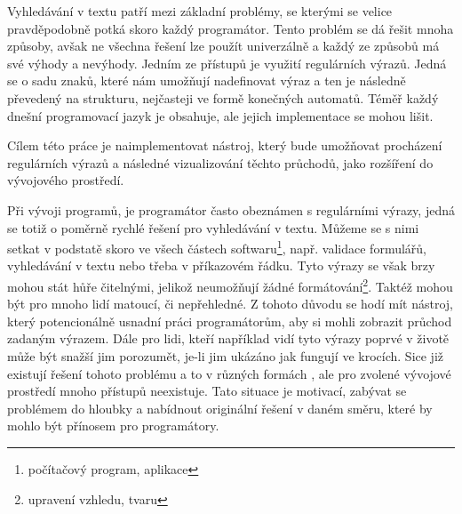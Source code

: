 Vyhledávání v textu patří mezi základní problémy, se kterými se velice pravděpodobně potká skoro každý programátor. 
Tento problém se dá řešit mnoha způsoby, avšak ne všechna řešení lze použít univerzálně a každý ze způsobů má své výhody a nevýhody.
Jedním ze přístupů je využití regulárních výrazů. Jedná se o sadu znaků, které nám umožňují nadefinovat výraz a ten je následně převedený na strukturu, nejčasteji ve formě konečných automatů.
Téměř každý dnešní programovací jazyk je obsahuje, ale jejich implementace se mohou lišit.

Cílem této práce je naimplementovat nástroj, který bude umožňovat procházení regulárních výrazů a následné vizualizování těchto průchodů, jako rozšíření do vývojového prostředí.

Při vývoji programů, je programátor často obeznámen s regulárními výrazy, jedná se totiž o poměrně rychlé řešení pro vyhledávání v textu. 
Můžeme se s nimi setkat v podstatě skoro ve všech částech softwaru\footnote[1]{počítačový program, aplikace}, např. validace formulářů, vyhledávání v textu nebo třeba v příkazovém řádku.
Tyto výrazy se však brzy mohou stát hůře čitelnými, jelikož neumožňují žádné formátování\footnote[2]{upravení vzhledu, tvaru}. 
Taktéž mohou být pro mnoho lidí matoucí, či nepřehledné.
Z tohoto důvodu se hodí mít nástroj, který potencionálně usnadní práci programátorům, aby si mohli zobrazit průchod zadaným výrazem.
Dále pro lidi, kteří například vidí tyto výrazy poprvé v životě může být snažší jim porozumět, je-li jim ukázáno jak fungují ve krocích.
Sice již existují řešení tohoto problému a to v různých formách \cite{Dib, Regexper, RegExr}, ale pro zvolené vývojové prostředí mnoho přístupů neexistuje.
Tato situace je motivací, zabývat se problémem do hloubky a nabídnout originální řešení v daném směru, které by mohlo být přínosem pro programátory.

\endinput